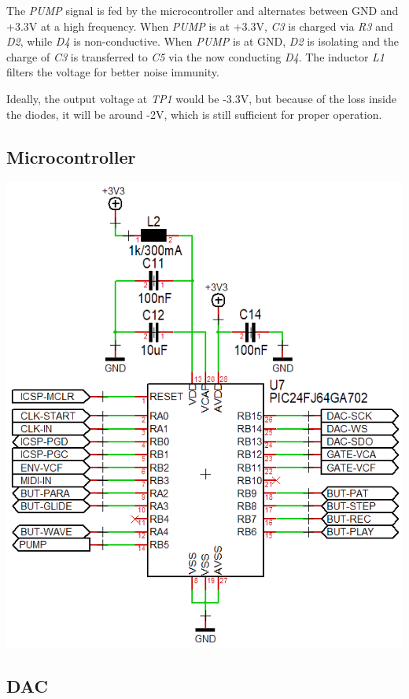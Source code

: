 \documentclass{scrartcl}
\begin{document}
The \emph{PUMP} signal is fed by the microcontroller and alternates between GND and +3.3V at a high frequency. When \emph{PUMP} is at +3.3V, \emph{C3} is charged via \emph{R3} and \emph{D2}, while \emph{D4} is non-conductive. When \emph{PUMP} is at GND, \emph{D2} is isolating and the charge of \emph{C3} is transferred to \emph{C5} via the now conducting \emph{D4}. The inductor \emph{L1} filters the voltage for better noise immunity.

Ideally, the output voltage at \emph{TP1} would be -3.3V, but because of the loss inside the diodes, it will be around -2V, which is still sufficient for proper operation.

\subsection{Microcontroller}

\begin{center}
    \includegraphics[scale=0.55]{assets/schema-mcu.png}
\end{center}

\subsection{DAC}
\end{document}
